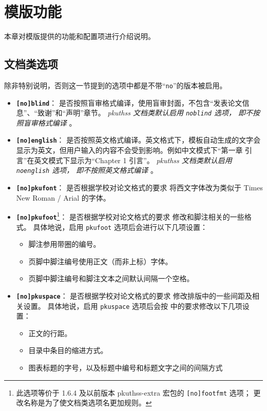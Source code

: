\chapter{模版功能}
本章对模版提供的功能和配置项进行介绍说明。

\section{文档类选项}
\label{sec:option}

除非特别说明，否则这一节提到的选项中都是不带“\verb|no|”的版本被启用。

\begin{itemize}
    \item \textbf{\texttt{[no]blind}}：
        是否按照盲审格式编译，使用盲审封面，不包含“发表论文信息”、“致谢”和“声明”章节。\emph{%
            pkuthss 文档类默认启用 \texttt{noblind} 选项，
            即不按照盲审格式编译%
        }。

    \item \textbf{\texttt{[no]english}}：
        是否按照英文格式编译。英文格式下，模板自动生成的文字会显示为英文，但用户输入的内容不会受到影响。例如中文模式下“第一章 引言”在英文模式下显示为“Chapter 1 引言”。\emph{%
            pkuthss 文档类默认启用 \texttt{noenglish} 选项，
            即不按照英文格式编译%
        }。

    \item \textbf{\texttt{[no]pkufont}}：
        是否根据学校对论文格式的要求\cite{pku-thesisstyle}%
        将西文字体改为类似于 Times New Roman / Arial 的字体。

    \item \textbf{\texttt{[no]pkufoot}}\footnote{%
            此选项等价于 1.6.4 及以前版本 pkuthss-extra 宏包的
            \texttt{[no]footfmt} 选项；
            更改名称是为了使文档类选项名更加规则。%
        }：
        是否根据学校对论文格式的要求\cite{pku-thesisstyle}%
        修改和脚注相关的一些格式。
        具体地说，启用 \verb|pkufoot| 选项后会进行以下几项设置：
    \begin{itemize}
        \item 脚注参用带圈的编号。
        \item 页脚中脚注编号使用正文（而非上标）字体。
        \item 页脚中脚注编号和脚注文本之间默认间隔一个空格。
    \end{itemize}

    \item \textbf{\texttt{[no]pkuspace}}：
        是否根据学校对论文格式的要求\cite{pku-thesisstyle}%
        修改排版中的一些间距及相关设置。
        具体地说，启用 \verb|pkuspace| 选项后会按
        \parencite{pku-thesisstyle} 中的要求修改以下几项设置：
    \begin{itemize}
        \item 正文的行距。
        \item 目录中条目的缩进方式。
        \item 图表标题的字号，以及标题中编号和标题文字之间的间隔方式
    \end{itemize}


\end{itemize}
